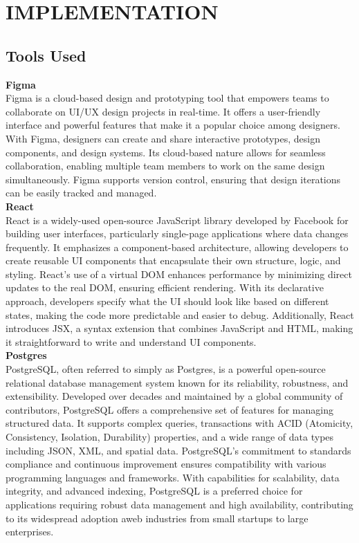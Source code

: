 \chapter{IMPLEMENTATION}





\section{Tools Used}
\textbf{Figma}\\
Figma is a cloud-based design and prototyping tool that empowers teams to collaborate on UI/UX design projects in real-time. It offers a user-friendly interface and powerful features that make it a popular choice among designers. With Figma, designers can create and share interactive prototypes, design components, and design systems. Its cloud-based nature allows for seamless collaboration, enabling multiple team members to work on the same design simultaneously. Figma supports version control, ensuring that design iterations can be easily tracked and managed. \\
\textbf{React}\\
React is a widely-used open-source JavaScript library developed by Facebook for building user interfaces, particularly single-page applications where data changes frequently. It emphasizes a component-based architecture, allowing developers to create reusable UI components that encapsulate their own structure, logic, and styling. React’s use of a virtual DOM enhances performance by minimizing direct updates to the real DOM, ensuring efficient rendering. With its declarative approach, developers specify what the UI should look like based on different states, making the code more predictable and easier to debug. Additionally, React introduces JSX, a syntax extension that combines JavaScript and HTML, making it straightforward to write and understand UI components.\\
\textbf{Postgres}\\
PostgreSQL, often referred to simply as Postgres, is a powerful open-source relational database management system known for its reliability, robustness, and extensibility. Developed over decades and maintained by a global community of contributors, PostgreSQL offers a comprehensive set of features for managing structured data. It supports complex queries, transactions with ACID (Atomicity, Consistency, Isolation, Durability) properties, and a wide range of data types including JSON, XML, and spatial data. PostgreSQL's commitment to standards compliance and continuous improvement ensures compatibility with various programming languages and frameworks. With capabilities for scalability, data integrity, and advanced indexing, PostgreSQL is a preferred choice for applications requiring robust data management and high availability, contributing to its widespread adoption aweb industries from small startups to large enterprises. \\

